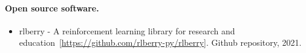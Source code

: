 \paragraph{Open source software.}

\begin{itemize}[label=]
    \item rlberry - A reinforcement learning library for research and education~[\url{https://github.com/rlberry-py/rlberry}]. Github repository, 2021.~\citep{rlberry2021}
\end{itemize}









% 
% 
